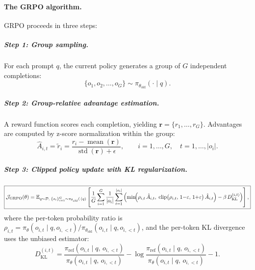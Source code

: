 \documentclass[12pt,a4paper]{report}
\begin{document}
\paragraph{The GRPO algorithm.}
GRPO proceeds in three steps:

\subparagraph{Step 1: Group sampling.}
For each prompt $q$, the current policy generates a group of $G$ independent completions:
\begin{equation}
\label{eq:grpo-sampling}
\{o_1, o_2, \ldots, o_G\} \sim \pi_{\theta_{\text{old}}}(\cdot \mid q).
\end{equation}

\subparagraph{Step 2: Group-relative advantage estimation.}
A reward function scores each completion, yielding $\mathbf{r} = \{r_1, \ldots, r_G\}$. Advantages are computed by z-score normalization within the group:
\begin{equation}
\label{eq:grpo-advantage}

\boxed{
\hat{A}_{i,t} = \tilde{r}_i
  = \frac{r_i - \operatorname{mean}(\mathbf{r})}
         {\operatorname{std}(\mathbf{r})+\epsilon},
\qquad i = 1, \ldots, G,
\quad t = 1, \ldots, |o_i|.}
\end{equation}

\subparagraph{Step 3: Clipped policy update with KL regularization.}
\begin{equation}
\label{eq:grpo-objective}
\boxed{
\mathcal{J}_{\text{GRPO}}(\theta)
  = \mathbb{E}_{q \sim \mathcal{D},\;
      \{o_i\}_{i=1}^{G} \sim \pi_{\theta_{\text{old}}}(\cdot|q)}
    \left[
      \frac{1}{G}\sum_{i=1}^{G}
      \frac{1}{|o_i|}\sum_{t=1}^{|o_i|}
      \left(
        \min\!\Bigl(
          \rho_{i,t}\,\hat{A}_{i,t},\;
          \operatorname{clip}\bigl(\rho_{i,t},\,
            1{-}\varepsilon,\,1{+}\varepsilon\bigr)\,\hat{A}_{i,t}
        \Bigr)
        - \beta\, D_{\mathrm{KL}}^{(i,t)}
      \right)
    \right],}
\end{equation}
where the per-token probability ratio is $\rho_{i,t} = \pi_\theta(o_{i,t} \mid q, o_{i,<t}) / \pi_{\theta_{\text{old}}}(o_{i,t} \mid q, o_{i,<t})$, and the per-token KL divergence uses the unbiased estimator:
\begin{equation}
\label{eq:grpo-kl}
D_{\mathrm{KL}}^{(i,t)}
  = \frac{\pi_{\text{ref}}(o_{i,t} \mid q,\, o_{i,<t})}
         {\pi_\theta(o_{i,t} \mid q,\, o_{i,<t})}
  - \log\frac{\pi_{\text{ref}}(o_{i,t} \mid q,\, o_{i,<t})}
             {\pi_\theta(o_{i,t} \mid q,\, o_{i,<t})}
  - 1.
\end{equation}
\end{document}
